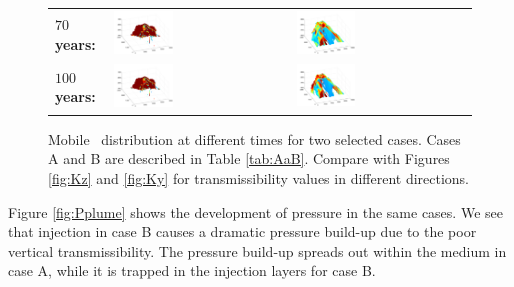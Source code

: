 \begin{figure}
\begin{tabular}{MMM}
\textbf{$70$ years:}&
\includegraphics[width=0.35\textwidth]{./figurer/C02222c70_pers}&
\includegraphics[width=0.35\textwidth]{./figurer/C03211c70_pers}\\
\textbf{$100$ years:}&
\includegraphics[width=0.35\textwidth]{./figurer/C02222c100_pers}&
\includegraphics[width=0.35\textwidth]{./figurer/C03211c100_pers}\\
\end{tabular}
\caption{Mobile \coo\ distribution at different times for two selected cases. Cases A and B are described in Table \ref{tab:AaB}. Compare with Figures \ref{fig:Kz} and \ref{fig:Ky} for transmissibility values in different directions.}
\label{fig:COplume}
\end{figure}

Figure \ref{fig:Pplume} shows the development of pressure in the same cases. We see that injection in case B causes a dramatic pressure build-up due to the poor vertical transmissibility. The pressure build-up spreads out within the medium in case A, while it is trapped in the injection layers for case B.

